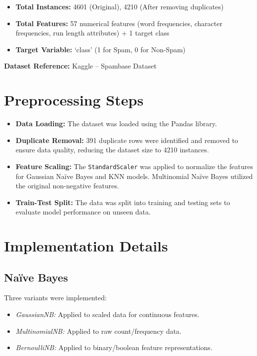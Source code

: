 \documentclass[11pt]{article}
\begin{document}
\begin{itemize}
    \item \textbf{Total Instances:} 4601 (Original), 4210 (After removing duplicates)
    \item \textbf{Total Features:} 57 numerical features (word frequencies, character frequencies, run length attributes) + 1 target class
    \item \textbf{Target Variable:} `class' (1 for Spam, 0 for Non-Spam)
\end{itemize}

\textbf{Dataset Reference:} Kaggle -- Spambase Dataset

\section{Preprocessing Steps}
\begin{itemize}
    \item \textbf{Data Loading:} The dataset was loaded using the Pandas library.
    \item \textbf{Duplicate Removal:} 391 duplicate rows were identified and removed to ensure data quality, reducing the dataset size to 4210 instances.
    \item \textbf{Feature Scaling:} The \texttt{StandardScaler} was applied to normalize the features for Gaussian Naïve Bayes and KNN models. Multinomial Naïve Bayes utilized the original non-negative features.
    \item \textbf{Train-Test Split:} The data was split into training and testing sets to evaluate model performance on unseen data.
\end{itemize}

\section{Implementation Details}

\subsection{Naïve Bayes}
Three variants were implemented:
\begin{itemize}
    \item \textit{GaussianNB:} Applied to scaled data for continuous features.
    \item \textit{MultinomialNB:} Applied to raw count/frequency data.
    \item \textit{BernoulliNB:} Applied to binary/boolean feature representations.
\end{itemize}
\end{document}
